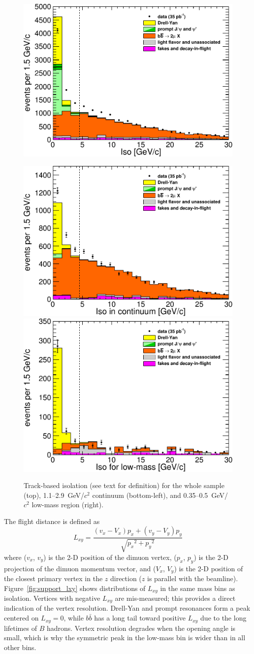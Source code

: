 \documentclass[12pt]{cms-tdr}
\begin{document}
\begin{figure}
\begin{center}
\includegraphics[width=0.5\linewidth]{PLOTS/support_iso_all.pdf}

\vspace{0.35 cm}
\includegraphics[width=0.48\linewidth]{PLOTS/support_iso_continuum.pdf}
\includegraphics[width=0.48\linewidth]{PLOTS/support_iso_lowmass.pdf}
\end{center}

\caption{Track-based isolation (see text for definition) for the
  whole sample (top), 1.1--2.9~GeV/$c^2$ continuum (bottom-left), and
  0.35--0.5~GeV/$c^2$ low-mass region (right). \label{fig:support_iso}}
\end{figure}

The flight distance is defined as
\begin{equation}
L_{xy} = \frac{(v_x - V_x) p_x + (v_y - V_y) p_y}{\sqrt{{p_x}^2 + {p_y}^2}}
\end{equation}
where ($v_x$, $v_y$) is the 2-D position of the dimuon vertex, ($p_x$,
$p_y$) is the 2-D projection of the dimuon momentum vector, and
($V_x$, $V_y$) is the 2-D position of the closest primary vertex in
the $z$ direction ($z$ is parallel with the beamline).
Figure~\ref{fig:support_lxy} shows distributions of $L_{xy}$ in the
same mass bins as isolation.  Vertices with negative $L_{xy}$ are
mis-measured; this provides a direct indication of the vertex
resolution.  Drell-Yan and prompt resonances form a peak centered on
$L_{xy} = 0$, while $b\bar{b}$ has a long tail toward positive
$L_{xy}$ due to the long lifetimes of $B$ hadrons.  Vertex resolution
degrades when the opening angle is small, which is why the symmetric
peak in the low-mass bin is wider than in all other bins.
\end{document}
